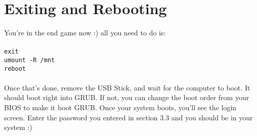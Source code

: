\documentclass{article}
\begin{document}
\section{Exiting and Rebooting}
You're in the end game now :) all you need to do is:
\\
\texttt{
  \\
  exit\\
  umount -R /mnt\\
  reboot
}
\\\\
Once that's done, remove the USB Stick, and wait for the computer to boot. It should boot right into GRUB. If not, you can change the boot order from your BIOS to make it boot GRUB. Once your system boots, you'll see the login screen. Enter the password you entered in section 3.3 and you should be in your system :)
\end{document}

